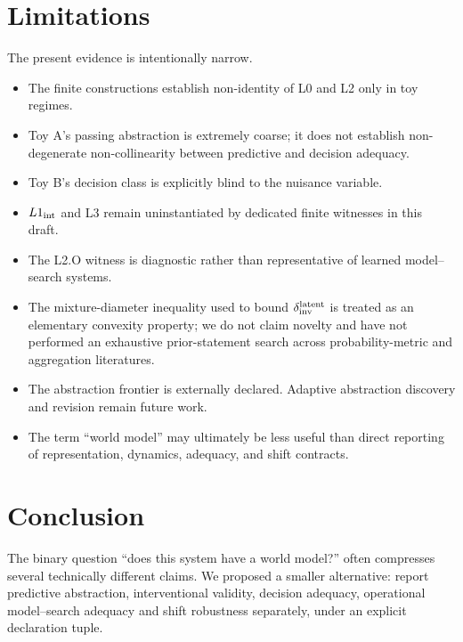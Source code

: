 \documentclass[10pt]{article}
\begin{document}
\section{Limitations}

The present evidence is intentionally narrow.

\begin{itemize}
    \item The finite constructions establish non-identity of L0 and L2 only in toy regimes.
    \item Toy A's passing abstraction is extremely coarse; it does not establish non-degenerate non-collinearity between predictive and decision adequacy.
    \item Toy B's decision class is explicitly blind to the nuisance variable.
    \item $L1_{\rm int}$ and L3 remain uninstantiated by dedicated finite witnesses in this draft.
    \item The L2.O witness is diagnostic rather than representative of learned model--search systems.
    \item The mixture-diameter inequality used to bound $\delta_{\rm inv}^{\rm latent}$ is treated as an elementary convexity property; we do not claim novelty and have not performed an exhaustive prior-statement search across probability-metric and aggregation literatures.
    \item The abstraction frontier is externally declared. Adaptive abstraction discovery and revision remain future work.
    \item The term ``world model'' may ultimately be less useful than direct reporting of representation, dynamics, adequacy, and shift contracts.
\end{itemize}

\section{Conclusion}

The binary question ``does this system have a world model?'' often compresses several technically different claims. We proposed a smaller alternative: report predictive abstraction, interventional validity, decision adequacy, operational model--search adequacy and shift robustness separately, under an explicit declaration tuple.
\end{document}
